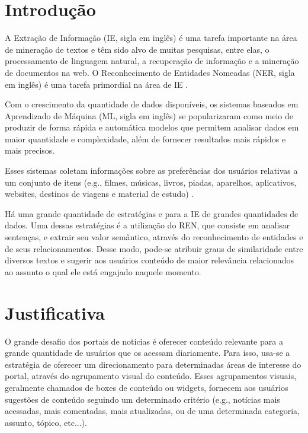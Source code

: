 \documentclass[12pt]{article}
\begin{document}
\section{Introdução}

A Extração de Informação (IE, sigla em inglês) é uma tarefa importante na área de mineração de textos e têm sido alvo de muitas pesquisas, entre elas, o processamento de linguagem natural, a recuperação de informação e a mineração de documentos na web. O Reconhecimento de Entidades Nomeadas (NER, sigla em inglês) é uma tarefa primordial na área de IE \cite{Amaral2013}.

Com o crescimento da quantidade de dados disponíveis, os sistemas baseados em Aprendizado de Máquina (ML, sigla em inglês) se popularizaram como meio de produzir de forma rápida e automática modelos que permitem analisar dados em maior quantidade  e complexidade, além de fornecer resultados mais rápidos e mais precisos. 

Esses sistemas coletam informações sobre as preferências dos usuários relativas a um conjunto de itens (e.g., filmes, músicas, livros, piadas, aparelhos, aplicativos, websites, destinos de viagens e material de estudo) \cite{Bobadilla2013109}.

Há uma grande quantidade de estratégias e para a IE de grandes quantidades de dados. Uma dessas estratégias é a utilização do REN, que  consiste em analisar sentenças, e extrair seu valor semântico, através do reconhecimento de entidades e de seus relacionamentos. Desse modo, pode-se atribuir graus de similaridade entre diversos textos e sugerir aos usuários conteúdo de maior relevância relacionados ao assunto o qual ele está engajado naquele momento.


\section{Justificativa}

O grande desafio dos portais de notícias é oferecer conteúdo relevante para a grande quantidade de usuários que os acessam diariamente. Para isso, usa-se a estratégia de oferecer um direcionamento para determinadas áreas de interesse do portal, através do agrupamento visual do conteúdo. Esses agrupamentos visuais, geralmente chamados de boxes de conteúdo ou widgets, fornecem aos usuários sugestões de conteúdo seguindo um determinado critério (e.g., notícias mais acessadas, mais comentadas, mais atualizadas, ou de uma determinada categoria, assunto, tópico, etc...).
\end{document}
